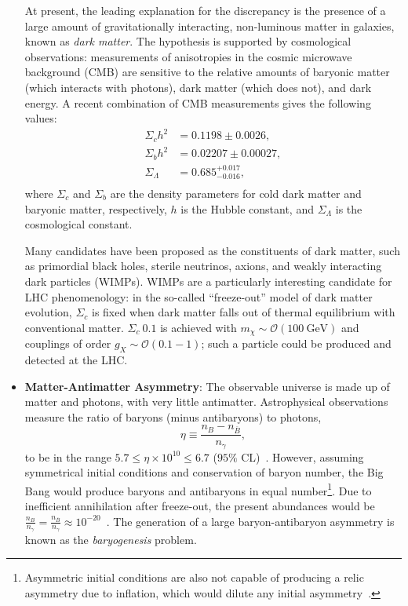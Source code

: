 \begin{itemize}
	At present, the leading explanation for the discrepancy is the presence of a large amount of gravitationally interacting, non-luminous matter in galaxies, known as \emph{dark matter}. The hypothesis is supported by cosmological observations: measurements of anisotropies in the cosmic microwave background (CMB) are sensitive to the relative amounts of baryonic matter (which interacts with photons), dark matter (which does not), and dark energy. A recent combination of CMB measurements gives the following values:
	\begin{align}
		\Sigma_{c}h^2 &= 0.1198 \pm 0.0026, \\
		\Sigma_{b}h^2 &= 0.02207 \pm 0.00027, \\
		\Sigma_{\Lambda} &= 0.685^{+0.017}_{-0.016}, \\
	\end{align}
	where $\Sigma_{c}$ and $\Sigma_{b}$ are the density parameters for cold dark matter and baryonic matter, respectively, $h$ is the Hubble constant, and $\Sigma_{\Lambda}$ is the cosmological constant. 

	Many candidates have been proposed as the constituents of dark matter, such as primordial black holes, sterile neutrinos, axions, and weakly interacting dark particles (WIMPs). WIMPs are a particularly interesting candidate for LHC phenomenology: in the so-called ``freeze-out'' model of dark matter evolution, $\Sigma_c$ is fixed when dark matter falls out of thermal equilibrium with conventional matter. $\Sigma_c~0.1$ is achieved with $m_{\chi}\sim \mathcal{O}(100~\mbox{GeV})$ and couplings of order $g_X\sim\mathcal{O}(0.1-1)$; such a particle could be produced and detected at the LHC. 

	\item \textbf{Matter-Antimatter Asymmetry}: The observable universe is made up of matter and photons, with very little antimatter. Astrophysical observations measure the ratio of baryons (minus antibaryons) to photons,
	\begin{equation}\label{eqn:baryon-photon-ratio}
		\eta \equiv \frac{n_B - n_{\overline{B}}}{n_{\gamma}}, 
	\end{equation}
	to be in the range $5.7 \leq \eta\times10^{10} \leq 6.7$ ($95\%$ CL)~\cite{pdg-bbn}. However, assuming symmetrical initial conditions and conservation of baryon number, the Big Bang would produce baryons and antibaryons in equal number\footnote{Asymmetric initial conditions are also not capable of producing a relic asymmetry due to inflation, which would dilute any initial asymmetry~\cite{cline}.}. Due to inefficient annihilation after freeze-out, the present abundances would be $\frac{n_B}{n_{\gamma}} = \frac{n_{\overline{B}}}{n_{\gamma}} \approx 10^{-20}$~\cite{cline}. The generation of a large baryon-antibaryon asymmetry is known as the \emph{baryogenesis} problem.


\end{itemize}
